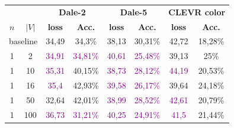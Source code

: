 \begin{table}[ht]
    \centering
    \begin{tabular}{cc|cc|cc|cc}
        \toprule
                                      &         & \multicolumn{2}{c}{\textbf{Dale-2}} & \multicolumn{2}{c}{\textbf{Dale-5}} & \multicolumn{2}{c}{\textbf{CLEVR color}}                                                                                         \\  \cmidrule(lr){3-4}\cmidrule(lr){5-6}\cmidrule(lr){7-8}
        $n$                           & $|V|$   & \textbf{loss}                       & \textbf{Acc.}                       & \textbf{loss}                            & \textbf{Acc.}               & \textbf{loss}             & \textbf{Acc.}               \\\midrule
        \multicolumn{2}{c|}{baseline} & {34,49} & {34,3\%}                            & {38,13}                             & {30,31\%}                                & {42,72}                     & {18,28\%}                                               \\\midrule
        {1}                           & {2}     & \textcolor{purple}{34,91}           & \textcolor{purple}{34,81\%}         & \textcolor{purple}{40,61}                & \textcolor{purple}{25,48\%} & {39,13}                   & {25\%}                      \\
        {1}                           & {10}    & \textcolor{purple}{35,31}           & {40,15\%}                           & \textcolor{purple}{38,73}                & \textcolor{purple}{28,12\%} & \textcolor{purple}{44,19} & {20,53\%}                   \\
        {1}                           & {16}    & \textcolor{purple}{35,4}            & {42,93\%}                           & \textcolor{purple}{39,58}                & \textcolor{purple}{26,17\%} & {39,64}                   & {24,18\%}                   \\
        {1}                           & {50}    & {32,64}                             & {42,01\%}                           & \textcolor{purple}{38,99}                & \textcolor{purple}{28,52\%} & \textcolor{purple}{42,61} & {20,79\%}                   \\
        {1}                           & {100}   & \textcolor{purple}{36,73}           & \textcolor{purple}{31,21\%}         & \textcolor{purple}{40,25}                & \textcolor{purple}{24,91\%} & \textcolor{purple}{41,5}  & {21,44\%}                   \\

\end{tabular}
\end{table}
